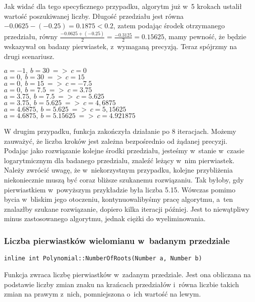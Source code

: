 Jak widać dla tego specyficznego przypadku, algorytm już w~5 krokach ustalił wartość poszukiwanej liczby. Długość przedziału jest równa $-0.0625-(-0.25)=0.1875<0.2$, zatem podając środek otrzymanego przedziału, równy $\frac{-0.0625+(-0.25)}{2}=\frac{-0.3125}{2}=0.15625$, mamy pewność, że będzie wskazywał on badany pierwiastek, z~wymaganą precyzją. Teraz spójrzmy na drugi scenariusz.

\begin{example}
	$a = -1,\ b = 30\ =>\ c=0$ \\
	$a = 0,\ b = 30\ =>\ c=15$ \\
	$a = 0,\ b = 15\ =>\ c=-7.5$ \\
	$a = 0,\ b = 7.5\ =>\ c=3.75$ \\
	$a = 3.75,\ b = 7.5\ =>\ c=5.625$ \\
	$a = 3.75,\ b = 5.625\ =>\ c=4,6875$ \\
	$a = 4.6875,\ b = 5.625\ =>\ c=5,15625$ \\
	$a = 4.6875,\ b = 5.15625\ =>\ c=4.921875$
\end{example}

W drugim przypadku, funkcja zakończyła działanie po 8 iteracjach. Możemy zauważyć, że liczba kroków jest zależna bezpośrednio od żądanej precyzji. Podając jako rozwiązanie kolejne środki przedziału, jesteśmy w~stanie w~czasie logarytmicznym dla badanego przedzialu, znaleźć leżący w~nim pierwiastek. Należy zwrócić uwagę, że w~niekorzystnym przypadku, kolejne przybliżenia niekoniecznie muszą być coraz bliższe szukanemu rozwiązaniu. Tak byłoby, gdy pierwiastkiem w~powyższym przykładzie była liczba 5.15. Wówczas pomimo bycia w~bliskim jego otoczeniu, kontynuowalibyśmy pracę algorytmu, a~ten znalazłby szukane rozwiązanie, dopiero kilka iteracji później. Jest to niewątpliwy minus zastosowanego algorytmu, jednak ciężki do wyeliminowania.

\subsubsection{Liczba pierwiastków wielomianu w~badanym przedziale}
\begin{lstlisting}
inline int Polynomial::NumberOfRoots(Number a, Number b)
\end{lstlisting}

Funkcja zwraca liczbę pierwiastków w~zadanym przedziale. Jest ona obliczana na podstawie liczby zmian znaku na krańcach przedziałów i~równa liczbie takich zmian na prawym z~nich, pomniejszona o~ich wartość na lewym.

